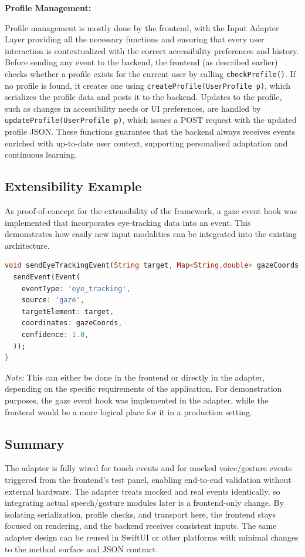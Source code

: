 \textbf{Profile Management:}

Profile management is mostly done by the frontend, with the Input Adapter Layer providing all the necessary functions and ensuring that every user interaction is contextualized with the correct accessibility preferences and history. Before sending any event to the backend, the frontend (as described earlier) checks whether a profile exists for the current user by calling \texttt{checkProfile()}. If no profile is found, it creates one using \texttt{createProfile(UserProfile p)}, which serializes the profile data and posts it to the backend. Updates to the profile, such as changes in accessibility needs or UI preferences, are handled by \texttt{updateProfile(UserProfile p)}, which issues a POST request with the updated profile JSON. These functions guarantee that the backend always receives events enriched with up-to-date user context, supporting personalised adaptation and continuous learning.

\subsection{Extensibility Example}
As proof-of-concept for the extensibility of the framework, a gaze event hook was implemented that incorporates eye-tracking data into an event. This demonstrates how easily new input modalities can be integrated into the existing architecture.
\begin{lstlisting}[language=Dart,basicstyle=\ttfamily\small,caption={Gaze event hook (testing harness)}]
void sendEyeTrackingEvent(String target, Map<String,double> gazeCoords) {
  sendEvent(Event(
    eventType: 'eye_tracking',
    source: 'gaze',
    targetElement: target,
    coordinates: gazeCoords,
    confidence: 1.0,
  ));
}
\end{lstlisting}
\textit{Note:} This can either be done in the frontend or directly in the adapter, depending on the specific requirements of the application. For demonstration purposes, the gaze event hook was implemented in the adapter, while the frontend would be a more logical place for it in a production setting.

\subsection{Summary}
The adapter is fully wired for touch events and for mocked voice/gesture events triggered from the frontend’s test panel, enabling end-to-end validation without external hardware. The adapter treats mocked and real events identically, so integrating actual speech/gesture modules later is a frontend-only change. By isolating serialization, profile checks, and transport here, the frontend stays focused on rendering, and the backend receives consistent inputs. The same adapter design can be reused in SwiftUI or other platforms with minimal changes to the method surface and JSON contract.

